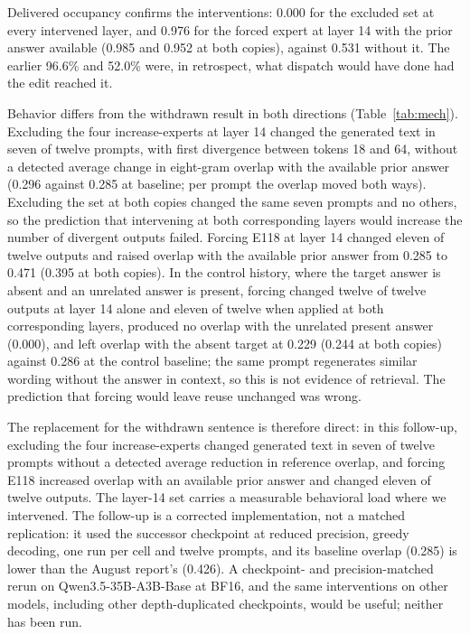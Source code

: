 \documentclass[10pt,a4paper,twocolumn]{article}
\begin{document}
Delivered occupancy confirms the interventions: 0.000 for the excluded set
at every intervened layer, and 0.976 for the forced expert at layer 14 with
the prior answer available (0.985 and 0.952 at both copies), against 0.531
without it. The earlier 96.6\% and 52.0\% were, in retrospect, what
dispatch would have done had the edit reached it.

Behavior differs from the withdrawn result in both directions
(Table~\ref{tab:mech}). Excluding the four increase-experts at layer 14
changed the generated text in seven of twelve prompts, with first
divergence between tokens 18 and 64, without a detected average change in
eight-gram overlap with the available prior answer (0.296 against 0.285 at
baseline; per prompt the overlap moved both ways). Excluding the set at
both copies changed the same seven prompts and no others, so the prediction
that intervening at both corresponding layers would increase the number of
divergent outputs failed. Forcing E118 at layer 14 changed eleven of twelve
outputs and raised overlap with the available prior answer from 0.285 to
0.471 (0.395 at both copies). In the control history, where the target
answer is absent and an unrelated answer is present, forcing changed twelve of twelve outputs at layer 14 alone and eleven of
twelve when applied at both corresponding layers, produced no overlap with the unrelated present answer (0.000), and
left overlap with the absent target at 0.229 (0.244 at both copies) against
0.286 at the control baseline; the same prompt regenerates similar wording
without the answer in context, so this is not evidence of retrieval. The
prediction that forcing would leave reuse unchanged was wrong.

The replacement for the withdrawn sentence is therefore direct: in this
follow-up, excluding the four increase-experts changed generated text in
seven of twelve prompts without a detected average reduction in reference
overlap, and forcing E118 increased overlap with an available prior answer
and changed eleven of twelve outputs. The layer-14 set carries a measurable
behavioral load where we intervened. The follow-up is a corrected
implementation, not a matched replication: it used the successor checkpoint
at reduced precision, greedy decoding, one run per cell and twelve prompts,
and its baseline overlap (0.285) is lower than the August report's (0.426).
A checkpoint- and precision-matched rerun on Qwen3.5-35B-A3B-Base at BF16,
and the same interventions on other models, including other
depth-duplicated checkpoints, would be useful; neither has been run.
\end{document}
